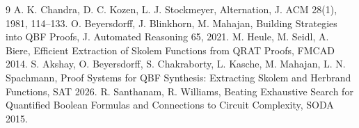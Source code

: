\documentclass[11pt]{article}
\begin{document}
\begin{thebibliography}{9}
 A. K. Chandra, D. C. Kozen, L. J. Stockmeyer, Alternation, J. ACM 28(1), 1981, 114--133.
 O. Beyersdorff, J. Blinkhorn, M. Mahajan, Building Strategies into QBF Proofs, J. Automated Reasoning 65, 2021.
 M. Heule, M. Seidl, A. Biere, Efficient Extraction of Skolem Functions from QRAT Proofs, FMCAD 2014.
 S. Akshay, O. Beyersdorff, S. Chakraborty, L. Kasche, M. Mahajan, L. N. Spachmann, Proof Systems for QBF Synthesis: Extracting Skolem and Herbrand Functions, SAT 2026.
 R. Santhanam, R. Williams, Beating Exhaustive Search for Quantified Boolean Formulas and Connections to Circuit Complexity, SODA 2015.
\end{thebibliography}
\end{document}
